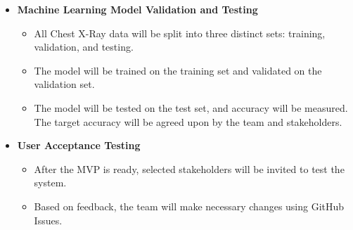 \documentclass[12pt, titlepage]{article}
\begin{document}
\begin{itemize}
  \item[] \textbf{Machine Learning Model Validation and Testing}
  \begin{itemize}
    \item All Chest X-Ray data will be split into three distinct sets: training, validation, and testing.
    \item The model will be trained on the training set and validated on the validation set.
    \item The model will be tested on the test set, and accuracy will be measured. The target accuracy will be agreed upon by the team and stakeholders.
  \end{itemize}

  \item[] \textbf{User Acceptance Testing}
  \begin{itemize}
    \item After the MVP is ready, selected stakeholders will be invited to test the system.
    \item Based on feedback, the team will make necessary changes using GitHub Issues.
  \end{itemize}

\end{itemize}
\end{document}
